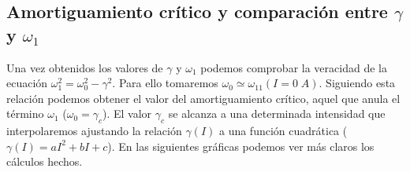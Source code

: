 \documentclass[a4paper,12pt,titlepage]{article}
\begin{document}
\newpage

\subsection{Amortiguamiento crítico y comparación entre $\gamma$ y $\omega_1$}

Una vez obtenidos los valores de $\gamma$ y $\omega_1$ podemos comprobar la veracidad de la ecuación $\omega_1^2 = \omega_0^2-\gamma^2$. Para ello tomaremos $\omega_0\simeq\omega_{11}(I=0\;A)$. Siguiendo esta relación podemos obtener el valor del amortiguamiento crítico, aquel que anula el término $\omega_1$ ($\omega_0=\gamma_c$). El valor $\gamma_c$ se alcanza a una determinada intensidad que interpolaremos ajustando la relación $\gamma(I)$ a una función cuadrática ($\gamma(I)=aI^2+bI+c$). En las siguientes gráficas podemos ver más claros los cálculos hechos.
\end{document}
